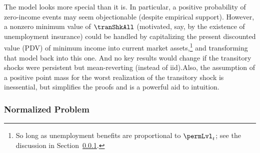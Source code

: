 \documentclass[BufferStockTheory]{subfiles}
\begin{document}
The model looks more special than it is.
In particular, a positive probability of zero-income events may seem objectionable (despite empirical support).
However, a nonzero minimum value of $\tranShkAll$ (motivated, say, by the existence of unemployment insurance) could be handled by capitalizing the present discounted value (PDV) of minimum income into current market assets,\footnote{So long as unemployment benefits are proportional to $\permLvl_{t}$; see the discussion in Section~\ref{subsubsec:ratio}.} and transforming that model back into this one.
And no key results would change if the transitory shocks were persistent but mean-reverting (instead of iid).\@ Also, the assumption of a positive point mass for the worst realization of the transitory shock is inessential, but simplifies the proofs and is a powerful aid to intuition.


\begin{comment}
Following footnotes and text were removed from the discussion above


\footnote{\cite{rabaultBorrowing} and~\cite{lsIncFluct} analyze cases where the shock processes have unbounded support.} 

and when $\permShkIndMin=\permShkIndMax=1$ the model becomes the degenerate case with no permanent shocks
\end{comment}

\hypertarget{The-Problem-Can-Be-Rewritten-in-Ratio-Form}{}
\hypertarget{The-Problem-Can-Be-Normalized-By-Permanent-Income}{}
\subsubsection{Normalized Problem}\label{subsubsec:ratio}
\end{document}
